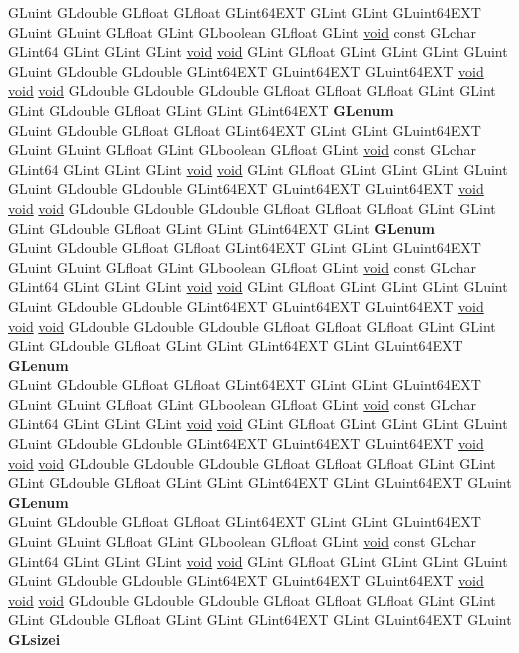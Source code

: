 \begin{DoxyCompactItemize}
\begin{tabbing}
\>GLuint GLdouble GLfloat GLfloat GLint64EXT GLint GLint GLuint64EXT GLuint GLuint GLfloat GLint GLboolean GLfloat GLint \hyperlink{interfacevoid}{void} const GLchar GLint64 GLint GLint GLint \hyperlink{interfacevoid}{void} \hyperlink{interfacevoid}{void} GLint GLfloat GLint GLint GLint GLuint GLuint GLdouble GLdouble GLint64EXT GLuint64EXT GLuint64EXT \hyperlink{interfacevoid}{void} \hyperlink{interfacevoid}{void} \hyperlink{interfacevoid}{void} GLdouble GLdouble GLdouble GLfloat GLfloat GLfloat GLint GLint GLint GLdouble GLfloat GLint GLint GLint64EXT {\bfseries GLenum}\\
\>GLuint GLdouble GLfloat GLfloat GLint64EXT GLint GLint GLuint64EXT GLuint GLuint GLfloat GLint GLboolean GLfloat GLint \hyperlink{interfacevoid}{void} const GLchar GLint64 GLint GLint GLint \hyperlink{interfacevoid}{void} \hyperlink{interfacevoid}{void} GLint GLfloat GLint GLint GLint GLuint GLuint GLdouble GLdouble GLint64EXT GLuint64EXT GLuint64EXT \hyperlink{interfacevoid}{void} \hyperlink{interfacevoid}{void} \hyperlink{interfacevoid}{void} GLdouble GLdouble GLdouble GLfloat GLfloat GLfloat GLint GLint GLint GLdouble GLfloat GLint GLint GLint64EXT GLint {\bfseries GLenum}\\
\>GLuint GLdouble GLfloat GLfloat GLint64EXT GLint GLint GLuint64EXT GLuint GLuint GLfloat GLint GLboolean GLfloat GLint \hyperlink{interfacevoid}{void} const GLchar GLint64 GLint GLint GLint \hyperlink{interfacevoid}{void} \hyperlink{interfacevoid}{void} GLint GLfloat GLint GLint GLint GLuint GLuint GLdouble GLdouble GLint64EXT GLuint64EXT GLuint64EXT \hyperlink{interfacevoid}{void} \hyperlink{interfacevoid}{void} \hyperlink{interfacevoid}{void} GLdouble GLdouble GLdouble GLfloat GLfloat GLfloat GLint GLint GLint GLdouble GLfloat GLint GLint GLint64EXT GLint GLuint64EXT {\bfseries GLenum}\\
\>GLuint GLdouble GLfloat GLfloat GLint64EXT GLint GLint GLuint64EXT GLuint GLuint GLfloat GLint GLboolean GLfloat GLint \hyperlink{interfacevoid}{void} const GLchar GLint64 GLint GLint GLint \hyperlink{interfacevoid}{void} \hyperlink{interfacevoid}{void} GLint GLfloat GLint GLint GLint GLuint GLuint GLdouble GLdouble GLint64EXT GLuint64EXT GLuint64EXT \hyperlink{interfacevoid}{void} \hyperlink{interfacevoid}{void} \hyperlink{interfacevoid}{void} GLdouble GLdouble GLdouble GLfloat GLfloat GLfloat GLint GLint GLint GLdouble GLfloat GLint GLint GLint64EXT GLint GLuint64EXT GLuint {\bfseries GLenum}\\
\>GLuint GLdouble GLfloat GLfloat GLint64EXT GLint GLint GLuint64EXT GLuint GLuint GLfloat GLint GLboolean GLfloat GLint \hyperlink{interfacevoid}{void} const GLchar GLint64 GLint GLint GLint \hyperlink{interfacevoid}{void} \hyperlink{interfacevoid}{void} GLint GLfloat GLint GLint GLint GLuint GLuint GLdouble GLdouble GLint64EXT GLuint64EXT GLuint64EXT \hyperlink{interfacevoid}{void} \hyperlink{interfacevoid}{void} \hyperlink{interfacevoid}{void} GLdouble GLdouble GLdouble GLfloat GLfloat GLfloat GLint GLint GLint GLdouble GLfloat GLint GLint GLint64EXT GLint GLuint64EXT GLuint {\bfseries GLsizei}\\

\end{tabbing}
\end{DoxyCompactItemize}
